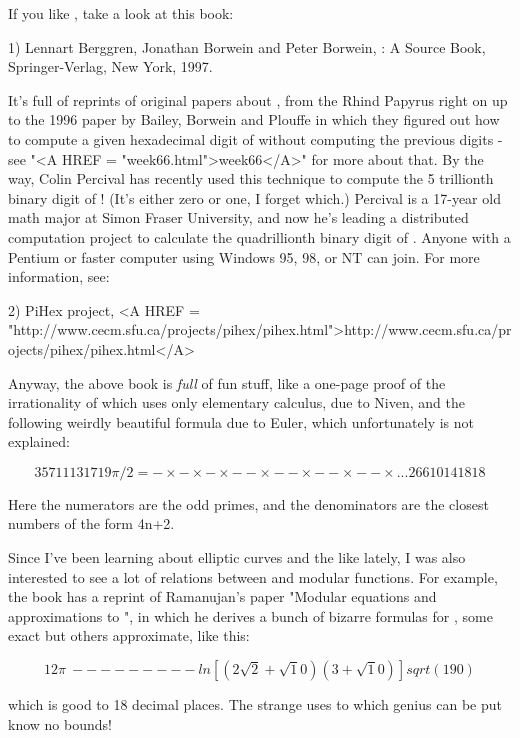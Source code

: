 

If you like \pi , take a look at this book:

1) Lennart Berggren, Jonathan Borwein and Peter Borwein, \Pi : A Source
Book, Springer-Verlag, New York, 1997.

It's full of reprints of original papers about \pi , from the Rhind
Papyrus right on up to the 1996 paper by Bailey, Borwein and Plouffe in
which they figured out how to compute a given hexadecimal digit of \pi 
without computing the previous digits - see "<A HREF = "week66.html">week66</A>" for more about
that.  By the way, Colin Percival has recently used this technique to
compute the 5 trillionth binary digit of \pi !  (It's either zero or one,
I forget which.)  Percival is a 17-year old math major at Simon Fraser
University, and now he's leading a distributed computation project to
calculate the quadrillionth binary digit of \pi .  Anyone with a Pentium
or faster computer using Windows 95, 98, or NT can join.   For more
information, see:

2) PiHex project, <A HREF = "http://www.cecm.sfu.ca/projects/pihex/pihex.html">http://www.cecm.sfu.ca/projects/pihex/pihex.html</A>

Anyway, the above book is \emph{full} of fun stuff, like a one-page proof 
of the irrationality of \pi  which uses only elementary calculus, due 
to Niven, and the following weirdly beautiful formula due to Euler, 
which unfortunately is not explained:

$$
              3   5   7   11   13   17   19
       \pi /2 = - \times  - \times  - \times  -- \times  -- \times  -- \times  -- \times  ...
              2   6   6   10   14   18   18
$$
    
Here the numerators are the odd primes, and the denominators are the
closest numbers of the form 4n+2.  

Since I've been learning about elliptic curves and the like lately, I
was also interested to see a lot of relations between \pi  and modular
functions.  For example, the book has a reprint of Ramanujan's  paper
"Modular equations and approximations to \pi ", in which he derives  a
bunch of bizarre formulas for \pi , some exact but others approximate,
like this:

$$
              12
      \pi  ~ ---------  ln[ (2 \sqrt 2 + \sqrt 10) (3 + \sqrt 10) ]
           sqrt(190)
$$
    
which is good to 18 decimal places.  The strange uses to which genius
can be put know no bounds!  

